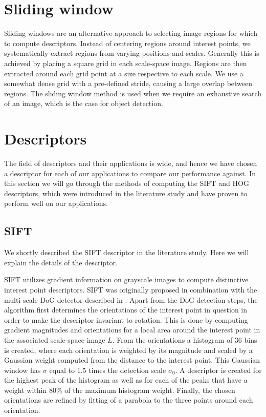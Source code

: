 \documentclass[thesis.tex]{subfiles}
\begin{document}
\section{Sliding window}
\label{sec:slidingWindow}
%
Sliding windows are an alternative approach to selecting image regions for which to compute descriptors. Instead of centering regions around interest points, we systematically extract regions from varying positions and scales. Generally this is achieved by placing a square grid in each scale-space image. Regions are then extracted around each grid point at a size respective to each scale. We use a somewhat dense grid with a pre-defined stride, causing a large overlap between regions. The sliding window method is used when we require an exhaustive search of an image, which is the case for object detection.

\section{Descriptors}

The field of descriptors and their applications is wide, and hence we have chosen a descriptor for each of our applications to compare our performance against. In this section we will go through the methods of computing the SIFT and HOG descriptors, which were introduced in the literature study and have proven to perform well on our applications.

\subsection{SIFT}

We shortly described the SIFT descriptor in the literature study. Here we will explain the details of the descriptor.

SIFT utilizes gradient information on grayscale images to compute distinctive interest point descriptors. SIFT was originally proposed in combination with the multi-scale DoG detector described in . Apart from the DoG detection steps, the algorithm first determines the orientations of the interest point in question in order to make the descriptor invariant to rotation. This is done by computing gradient magnitudes and orientations for a local area around the interest point in the associated scale-space image $L$. From the orientations a histogram of 36 bins is created, where each orientation is weighted by its magnitude and scaled by a Gaussian weight computed from the distance to the interest point. This Gaussian window has $\sigma$ equal to $1.5$ times the detection scale $\sigma_0$. A descriptor is created for the highest peak of the histogram as well as for each of the peaks that have a weight within 80\% of the maximum histogram weight. Finally, the chosen orientations are refined by fitting of a parabola to the three points around each orientation.
\end{document}
